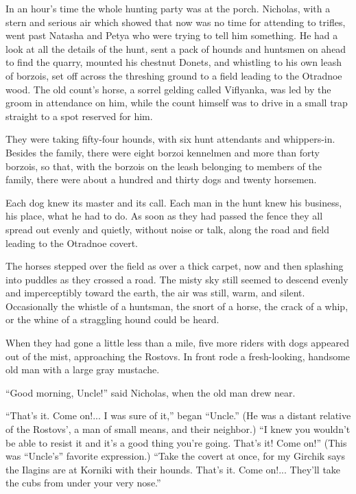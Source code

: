 In an hour's time the whole hunting party was at the
porch. Nicholas, with a stern and serious air which showed that
now was no time for attending to trifles, went past Natasha and
Petya who were trying to tell him something. He had a look at all
the details of the hunt, sent a pack of hounds and huntsmen on
ahead to find the quarry, mounted his chestnut Donets, and
whistling to his own leash of borzois, set off across the
threshing ground to a field leading to the Otradnoe wood. The old
count's horse, a sorrel gelding called Viflyanka, was led by the
groom in attendance on him, while the count himself was to drive
in a small trap straight to a spot reserved for him.

They were taking fifty-four hounds, with six hunt attendants and
whippers-in. Besides the family, there were eight borzoi
kennelmen and more than forty borzois, so that, with the borzois
on the leash belonging to members of the family, there were about
a hundred and thirty dogs and twenty horsemen.

Each dog knew its master and its call. Each man in the hunt knew
his business, his place, what he had to do. As soon as they had
passed the fence they all spread out evenly and quietly, without
noise or talk, along the road and field leading to the Otradnoe
covert.

The horses stepped over the field as over a thick carpet, now and
then splashing into puddles as they crossed a road. The misty sky
still seemed to descend evenly and imperceptibly toward the
earth, the air was still, warm, and silent. Occasionally the
whistle of a huntsman, the snort of a horse, the crack of a whip,
or the whine of a straggling hound could be heard.

When they had gone a little less than a mile, five more riders
with dogs appeared out of the mist, approaching the Rostovs. In
front rode a fresh-looking, handsome old man with a large gray
mustache.

``Good morning, Uncle!'' said Nicholas, when the old man drew
near.

``That's it. Come on!... I was sure of it,'' began ``Uncle.'' (He
was a distant relative of the Rostovs', a man of small means, and
their neighbor.) ``I knew you wouldn't be able to resist it and
it's a good thing you're going. That's it! Come on!'' (This was
``Uncle's'' favorite expression.) ``Take the covert at once, for
my Girchik says the Ilagins are at Korniki with their
hounds. That's it. Come on!... They'll take the cubs from under
your very nose.''

